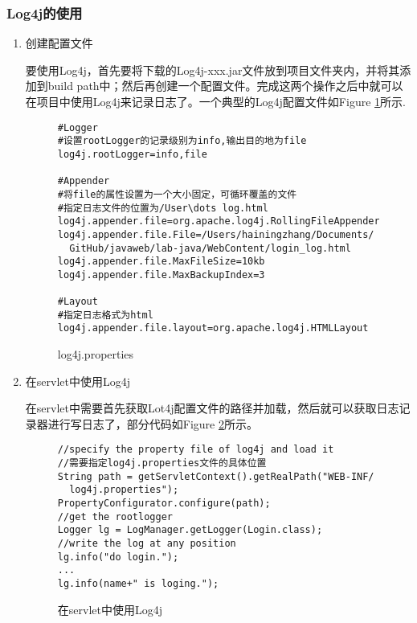 \subsubsection{Log4j的使用}
\begin{enumerate}
\item
创建配置文件

要使用Log4j，首先要将下载的Log4j-xxx.jar文件放到项目文件夹内，并将其添加到build path中；然后再创建一个配置文件。完成这两个操作之后中就可以在项目中使用Log4j来记录日志了。一个典型的Log4j配置文件如Figure \ref{log4j}所示.
\begin{figure}
\begin{verbatim}
#Logger
#设置rootLogger的记录级别为info,输出目的地为file
log4j.rootLogger=info,file

#Appender
#将file的属性设置为一个大小固定，可循环覆盖的文件
#指定日志文件的位置为/User\dots log.html
log4j.appender.file=org.apache.log4j.RollingFileAppender
log4j.appender.file.File=/Users/hainingzhang/Documents/
  GitHub/javaweb/lab-java/WebContent/login_log.html
log4j.appender.file.MaxFileSize=10kb
log4j.appender.file.MaxBackupIndex=3

#Layout
#指定日志格式为html
log4j.appender.file.layout=org.apache.log4j.HTMLLayout
\end{verbatim}
\caption{log4j.properties}
\label{log4j}
\end{figure}
\item
在servlet中使用Log4j

在servlet中需要首先获取Lot4j配置文件的路径并加载，然后就可以获取日志记录器进行写日志了，部分代码如Figure \ref{log4jserv}所示。
\begin{figure}
\begin{verbatim}
//specify the property file of log4j and load it
//需要指定log4j.properties文件的具体位置
String path = getServletContext().getRealPath("WEB-INF/
  log4j.properties");
PropertyConfigurator.configure(path);
//get the rootlogger
Logger lg = LogManager.getLogger(Login.class);
//write the log at any position
lg.info("do login.");
...
lg.info(name+" is loging.");
\end{verbatim}
\caption{在servlet中使用Log4j}
\label{log4jserv}
\end{figure}

\end{enumerate}

